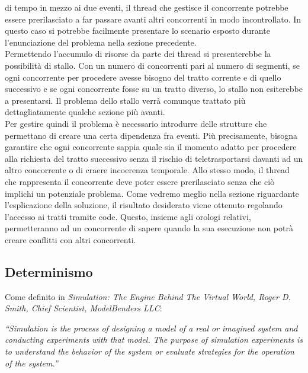 di tempo in mezzo ai due eventi, il thread che gestisce il concorrente potrebbe essere prerilasciato a far passare avanti altri concorrenti
in modo incontrollato. In questo caso si potrebbe facilmente presentare lo scenario esposto durante l'enunciazione del problema nella sezione
precedente.\\
Permettendo l'accumulo di risorse da parte dei thread si presenterebbe la possibilità di stallo. Con un numero di concorrenti pari al numero di
segmenti, se ogni concorrente per procedere avesse bisogno del tratto corrente e di quello successivo e se ogni concorrente
fosse su un tratto diverso, lo stallo non esiterebbe a presentarsi.
Il problema dello stallo verrà comunque trattato più dettagliatamente qualche sezione più avanti.\\
Per gestire quindi il problema è necessario introdurre delle strutture che permettano di creare una certa dipendenza fra eventi. Più precisamente,
bisogna garantire che ogni concorrente sappia quale sia il momento adatto per procedere alla richiesta del tratto successivo senza il rischio
di teletrasportarsi davanti ad un altro concorrente o di craere incoerenza temporale. Allo stesso modo, il thread che rappresenta il concorrente
deve poter essere prerilasciato senza che ciò implichi un potenziale problema. Come vedremo meglio nella sezione riguardante l'esplicazione
della soluzione, il risultato desiderato viene ottenuto regolando l'accesso ai tratti tramite code. Questo, insieme agli orologi relativi,
permetteranno ad un concorrente di sapere quando la sua esecuzione non potrà creare conflitti con altri concorrenti.
\subsection{Determinismo}
Come definito in \emph{Simulation: The Engine Behind The Virtual World, Roger D. Smith, Chief Scientist, ModelBenders LLC}:

\emph{``Simulation is the process of designing a model of a real or imagined system and
conducting experiments with that model. The purpose of simulation experiments is to
understand the behavior of the system or evaluate strategies for the operation of the system.''}

